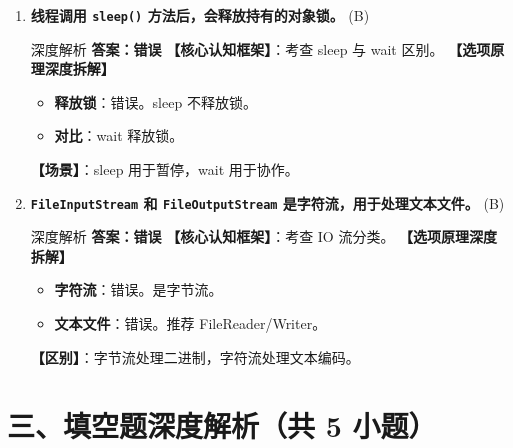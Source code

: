\documentclass[12pt, a4paper]{ctexart}
\newcommand{\code}[1]{\texttt{#1}}
\newcommand{\tfblank}{\underline{\hspace{1.5em}}}
\begin{document}
\begin{enumerate}[label=\textbf{\arabic*.}, itemsep=1em]
    \item \textbf{线程调用 \code{sleep()} 方法后，会释放持有的对象锁。} \tfblank (B)
    \begin{bluebox}{深度解析}
    \textbf{答案：错误}
    \textbf{【核心认知框架】}：考查 sleep 与 wait 区别。
    \textbf{【选项原理深度拆解】}
    \begin{itemize}[leftmargin=*, nosep]
        \item \textbf{释放锁}：错误。sleep 不释放锁。
        \item \textbf{对比}：wait 释放锁。
    \end{itemize}
    \textbf{【场景】}：sleep 用于暂停，wait 用于协作。
    \end{bluebox}

    \item \textbf{\code{FileInputStream} 和 \code{FileOutputStream} 是字符流，用于处理文本文件。} \tfblank (B)
    \begin{bluebox}{深度解析}
    \textbf{答案：错误}
    \textbf{【核心认知框架】}：考查 IO 流分类。
    \textbf{【选项原理深度拆解】}
    \begin{itemize}[leftmargin=*, nosep]
        \item \textbf{字符流}：错误。是字节流。
        \item \textbf{文本文件}：错误。推荐 FileReader/Writer。
    \end{itemize}
    \textbf{【区别】}：字节流处理二进制，字符流处理文本编码。
    \end{bluebox}
\end{enumerate}

\section*{三、填空题深度解析（共 5 小题）}
\end{document}
